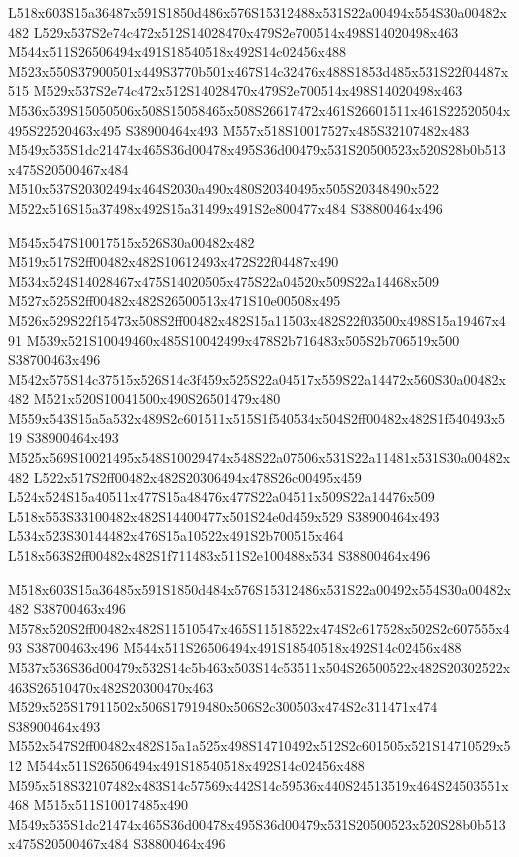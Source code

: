 \documentclass{article}
\begin{document}
\begin{multicols}{2}
L518x603S15a36487x591S1850d486x576S15312488x531S22a00494x554S30a00482x482 L529x537S2e74c472x512S14028470x479S2e700514x498S14020498x463 M544x511S26506494x491S18540518x492S14c02456x488 M523x550S37900501x449S3770b501x467S14c32476x488S1853d485x531S22f04487x515 M529x537S2e74c472x512S14028470x479S2e700514x498S14020498x463 M536x539S15050506x508S15058465x508S26617472x461S26601511x461S22520504x495S22520463x495 S38900464x493 M557x518S10017527x485S32107482x483 M549x535S1dc21474x465S36d00478x495S36d00479x531S20500523x520S28b0b513x475S20500467x484 M510x537S20302494x464S2030a490x480S20340495x505S20348490x522 M522x516S15a37498x492S15a31499x491S2e800477x484 S38800464x496

M545x547S10017515x526S30a00482x482 M519x517S2ff00482x482S10612493x472S22f04487x490 M534x524S14028467x475S14020505x475S22a04520x509S22a14468x509 M527x525S2ff00482x482S26500513x471S10e00508x495 M526x529S22f15473x508S2ff00482x482S15a11503x482S22f03500x498S15a19467x491 M539x521S10049460x485S10042499x478S2b716483x505S2b706519x500 S38700463x496 M542x575S14c37515x526S14c3f459x525S22a04517x559S22a14472x560S30a00482x482 M521x520S10041500x490S26501479x480 M559x543S15a5a532x489S2c601511x515S1f540534x504S2ff00482x482S1f540493x519 S38900464x493 M525x569S10021495x548S10029474x548S22a07506x531S22a11481x531S30a00482x482 L522x517S2ff00482x482S20306494x478S26c00495x459 L524x524S15a40511x477S15a48476x477S22a04511x509S22a14476x509 L518x553S33100482x482S14400477x501S24e0d459x529 S38900464x493 L534x523S30144482x476S15a10522x491S2b700515x464 L518x563S2ff00482x482S1f711483x511S2e100488x534 S38800464x496

M518x603S15a36485x591S1850d484x576S15312486x531S22a00492x554S30a00482x482 S38700463x496 M578x520S2ff00482x482S11510547x465S11518522x474S2c617528x502S2c607555x493 S38700463x496 M544x511S26506494x491S18540518x492S14c02456x488 M537x536S36d00479x532S14c5b463x503S14c53511x504S26500522x482S20302522x463S26510470x482S20300470x463 M529x525S17911502x506S17919480x506S2c300503x474S2c311471x474 S38900464x493 M552x547S2ff00482x482S15a1a525x498S14710492x512S2c601505x521S14710529x512 M544x511S26506494x491S18540518x492S14c02456x488 M595x518S32107482x483S14c57569x442S14c59536x440S24513519x464S24503551x468 M515x511S10017485x490 M549x535S1dc21474x465S36d00478x495S36d00479x531S20500523x520S28b0b513x475S20500467x484 S38800464x496


\end{multicols}
\end{document}
